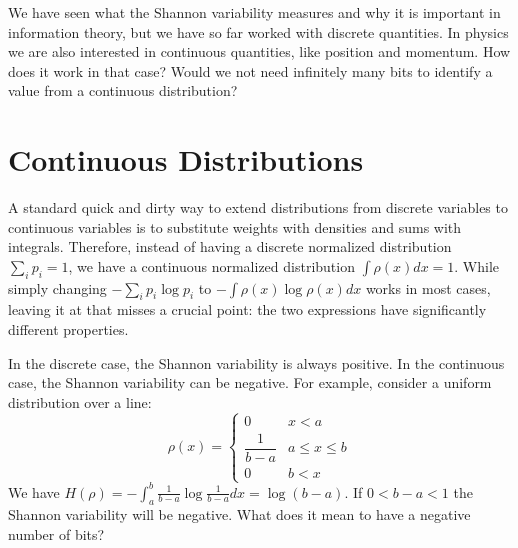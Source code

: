 \documentclass[prb, twocolumn]{revtex4-1}
\begin{document}



We have seen what the Shannon variability measures and why it is important in information theory, but we have so far worked with discrete quantities. In physics we are also interested in continuous quantities, like position and momentum. How does it work in that case? Would we not need infinitely many bits to identify a value from a continuous distribution?

\section{Continuous Distributions}\label{sec_cont}

A standard quick and dirty way to extend distributions from discrete variables to continuous variables is to substitute weights with densities and sums with integrals. Therefore, instead of having a discrete normalized distribution $\sum_i p_i = 1$, we have a continuous normalized distribution $\int \rho(x)dx=1$. While simply changing $- \sum_i p_i \log p_i$ to $- \int \rho(x) \log \rho(x) dx$ works in most cases, leaving it at that misses a crucial point: the two expressions have significantly different properties.

In the discrete case, the Shannon variability is always positive. In the continuous case, the Shannon variability can be negative. For example, consider a uniform distribution over a line:
\begin{equation}
\rho(x)=
\begin{cases}
0 & x < a\\
\dfrac{1}{b-a} & a \leq x \leq b\\
0 & b < x
\end{cases}
\end{equation}
We have $H(\rho) = - \int_a^b \frac{1}{b-a} \log \frac{1}{b-a} dx = \log (b-a)$. If $0 < b-a < 1$ the Shannon variability will be negative. What does it mean to have a negative number of bits?
\end{document}
